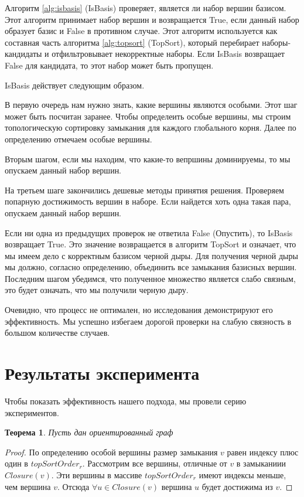 \documentclass[12pt,a4paper,oneside]{article}
\newtheorem{theorem}{Теорема}
\theoremstyle{definition}
\theoremstyle{lemma}
\theoremstyle{remark}
\begin{document}
Алгоритм \ref{alg:isbasis} (IsBasis)  проверяет, является ли набор вершин базисом. Этот алгоритм принимает набор вершин и возвращается True, если данный набор образует базис и False в противном случае. Этот алгоритм используется как составная часть алгоритма \ref{alg:topsort} (TopSort), который перебирает наборы-кандидаты и отфильтровывает некорректные наборы. Если IsBasis возвращает False для кандидата, то этот набор может быть пропущен.

IsBasis действует следующим образом.

В первую очередь нам нужно знать, какие вершины являются особыми. Этот шаг может быть посчитан заранее. Чтобы определеить особые вершины, мы строим топологическую сортировку замыкания для каждого глобального корня. Далее по определению отмечаем особые вершины.

Вторым шагом, если мы находим, что какие-то вепршины доминируемы, то мы опускаем данный набор вершин.

На третьем шаге закончились дешевые методы принятия решения. Проверяем попарную достижимость вершин в наборе. Если найдется хоть одна такая пара, опускаем данный набор вершин.

Если ни одна из предыдущих проверок не ответила False (Опустить), то IsBasis возвращает True. Это значение возвращается в алгоритм TopSort и означает, что мы имеем дело с корректным базисом черной дыры. Для получения черной дыры мы должно, согласно определению, объединить все замыкания базисных вершин. Последним шагом убедимся, что полученное множество является слабо связным, это будет означать, что мы получили черную дыру.

Очевидно, что процесс не оптимален, но исследования демонстрируют его эффективность. Мы успешно избегаем дорогой проверки на слабую связность в большом количестве случаев.

\cleardoublepage
\section{Результаты эксперимента}\label{sec:experimentalresults}

Чтобы показать эффективность нашего подхода, мы провели серию экспериментов.


\begin{theorem}
Пусть дан ориентированный граф
\end{theorem}
\begin{proof}
По определению особой вершины размер замыкания $v$ равен индексу плюс один в $topSortOrder_r$. Рассмотрим все вершины, отличные от $v$ в замыканиии $Closure(v)$. Эти вершины в массиве $topSortOrder_r$ имеют индексы меньше, чем вершина $v$. Отсюда $\forall u \in Closure(v)$ вершина $u$ будет достижима из $v$.
\end{proof}
\end{document}
